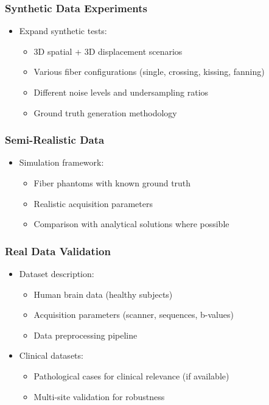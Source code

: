 \documentclass[journal,twoside,web]{ieeecolor}
\begin{document}
\subsubsection{Synthetic Data Experiments}
\begin{itemize}
    \item Expand synthetic tests:
    \begin{itemize}
        \item 3D spatial + 3D displacement scenarios
        \item Various fiber configurations (single, crossing, kissing, fanning)
        \item Different noise levels and undersampling ratios
        \item Ground truth generation methodology
    \end{itemize}
\end{itemize}

\subsubsection{Semi-Realistic Data}
\begin{itemize}
    \item Simulation framework:
    \begin{itemize}
        \item Fiber phantoms with known ground truth
        \item Realistic acquisition parameters
        \item Comparison with analytical solutions where possible
    \end{itemize}
\end{itemize}

\subsubsection{Real Data Validation}
\begin{itemize}
    \item Dataset description:
    \begin{itemize}
        \item Human brain data (healthy subjects)
        \item Acquisition parameters (scanner, sequences, b-values)
        \item Data preprocessing pipeline
    \end{itemize}
    \item Clinical datasets:
    \begin{itemize}
        \item Pathological cases for clinical relevance (if available)
        \item Multi-site validation for robustness
    \end{itemize}
\end{itemize}
\end{document}
